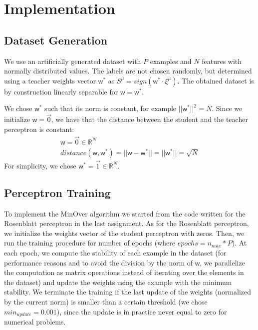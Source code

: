\section{Implementation}
\label{sec:implementation}

\subsection{Dataset Generation}
We use an artificially generated dataset with $P$ examples and $N$ features with normally distributed values.
The labels are not chosen randomly, but determined using a teacher weights vector $\bm{\mathsf{w}}^*$ as $S^\mu = sign(\mathsf{w}^{*} \cdotp \xi^\mu)$.
The obtained dataset is by construction linearly separable for $\bm{\mathsf{w}} = \bm{\mathsf{w}}^*$.

We chose $\bm{\mathsf{w}}^*$ such that its norm is constant, for example $||\bm{\mathsf{w}}^*||^2 = N$.
Since we initialize $\bm{\mathsf{w}} = \overrightarrow{0}$, we have that the distance between the student and the teacher perceptron is constant:
\begin{gather*}
    \bm{\mathsf{w}} = \overrightarrow{0} \in \mathbb{R}^N \\
    distance(\bm{\mathsf{w}}, \bm{\mathsf{w}}^*) = || \bm{\mathsf{w}} - \bm{\mathsf{w}}^* || = || \bm{\mathsf{w}}^*|| = \sqrt{N}
\end{gather*}
For simplicity, we chose $\bm{\mathsf{w}^*} = \overrightarrow{1} \in \mathbb{R}^N$.

\subsection{Perceptron Training}
To implement the MinOver algorithm we started from the code written for the Rosenblatt perceptron in the last assignment.
As for the Rosenblatt perceptron, we initialize the weights vector of the student perceptron with zeros.
Then, we run the training procedure for number of epochs (where $epochs = n_{max} * P$).
At each epoch, we compute the stability of each example in the dataset (for performance reasons and to avoid the division by the norm of $\bm{\mathsf{w}}$, we parallelize the computation as matrix operations instead of iterating over the elements in the dataset) and update the weights using the example with the minimum stability.
We terminate the training if the last update of the weights (normalized by the current norm) is smaller than a certain threshold (we chose $min_{update} = 0.001$), since the update is in practice never equal to zero for numerical problems.


